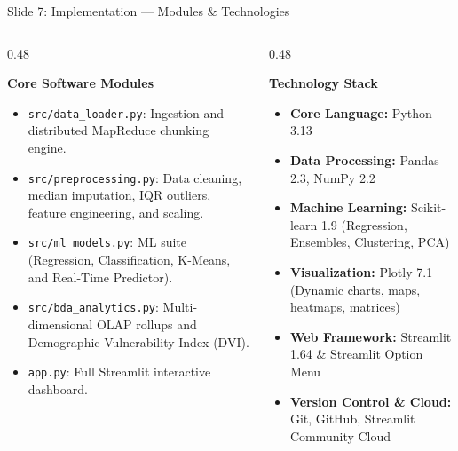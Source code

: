 \documentclass[10pt, aspectratio=169]{beamer}
\begin{document}
\begin{frame}{Slide 7: Implementation --- Modules \& Technologies}
    \begin{columns}[T]
        \begin{column}{0.48\textwidth}
            \begin{block}{\textbf{Core Software Modules}}
                \begin{itemize}
                    \item \texttt{src/data\_loader.py}: Ingestion and distributed MapReduce chunking engine.
                    \item \texttt{src/preprocessing.py}: Data cleaning, median imputation, IQR outliers, feature engineering, and scaling.
                    \item \texttt{src/ml\_models.py}: ML suite (Regression, Classification, K-Means, and Real-Time Predictor).
                    \item \texttt{src/bda\_analytics.py}: Multi-dimensional OLAP rollups and Demographic Vulnerability Index (DVI).
                    \item \texttt{app.py}: Full Streamlit interactive dashboard.
                \end{itemize}
            \end{block}
        \end{column}
        \begin{column}{0.48\textwidth}
            \begin{block}{\textbf{Technology Stack}}
                \begin{itemize}
                    \item \textbf{Core Language:} Python 3.13
                    \item \textbf{Data Processing:} Pandas 2.3, NumPy 2.2
                    \item \textbf{Machine Learning:} Scikit-learn 1.9 (Regression, Ensembles, Clustering, PCA)
                    \item \textbf{Visualization:} Plotly 7.1 (Dynamic charts, maps, heatmaps, matrices)
                    \item \textbf{Web Framework:} Streamlit 1.64 \& Streamlit Option Menu
                    \item \textbf{Version Control \& Cloud:} Git, GitHub, Streamlit Community Cloud
                \end{itemize}
            \end{block}
        \end{column}
    \end{columns}
\end{frame}
\end{document}
